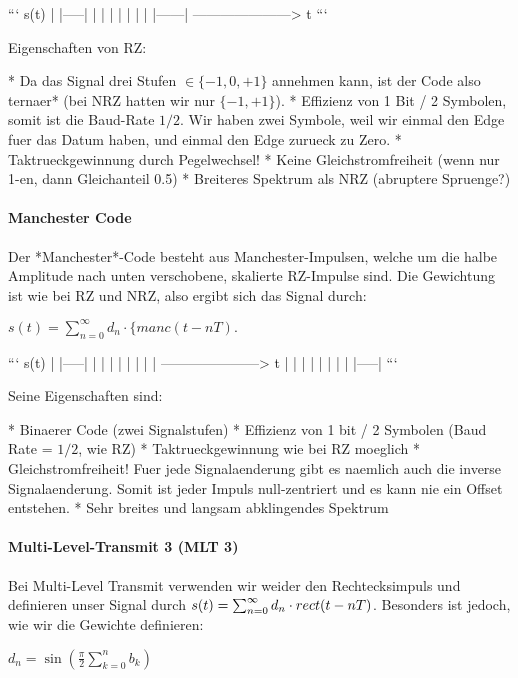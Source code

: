 ```
         s(t)
          |
    |-----|
    |     |
    |     |
    |     |
    |     |------|
---------------------> t
```

Eigenschaften von RZ:

* Da das Signal drei Stufen $\in \{-1, 0, +1\}$ annehmen kann, ist der Code also ternaer* (bei NRZ hatten wir nur $\{-1, +1\}$).
* Effizienz von 1 Bit / 2 Symbolen, somit ist die Baud-Rate $1/2$. Wir haben zwei Symbole, weil wir einmal den Edge fuer das Datum haben, und einmal den Edge zurueck zu Zero.
* Taktrueckgewinnung durch Pegelwechsel!
* Keine Gleichstromfreiheit (wenn nur 1-en, dann Gleichanteil 0.5)
* Breiteres Spektrum als NRZ (abruptere Spruenge?)

\paragraph{ Manchester Code}

Der *Manchester*-Code besteht aus Manchester-Impulsen, welche um die halbe
Amplitude nach unten verschobene, skalierte RZ-Impulse sind. Die Gewichtung ist
wie bei RZ und NRZ, also ergibt sich das Signal durch:

$s(t) = \sum_{n = 0}^\infty d_n \cdot \{manc(t - nT).$

```
         s(t)
          |
    |-----|
    |     |
    |     |
    |     |
    |     |
---------------------> t
          |     |
          |     |
          |     |
          |     |
          |-----|
```

Seine Eigenschaften sind:

* Binaerer Code (zwei Signalstufen)
* Effizienz von 1 bit / 2 Symbolen (Baud Rate = $1/2$, wie RZ)
* Taktrueckgewinnung wie bei RZ moeglich
* Gleichstromfreiheit! Fuer jede Signalaenderung gibt es naemlich auch die inverse Signalaenderung. Somit ist jeder Impuls null-zentriert und es kann nie ein Offset entstehen.
* Sehr breites und langsam abklingendes Spektrum

\paragraph{ Multi-Level-Transmit 3 (MLT 3)}

Bei Multi-Level Transmit verwenden wir weider den Rechtecksimpuls und definieren
unser Signal durch $s(t) = \sum_{n=0}^\infty d_n \cdot \mathop{rect}(t -
nT)$. Besonders ist jedoch, wie wir die Gewichte definieren:

$d_n = \sin\left(\frac{\pi}{2}\sum_{k=0}^n b_k\right)$

